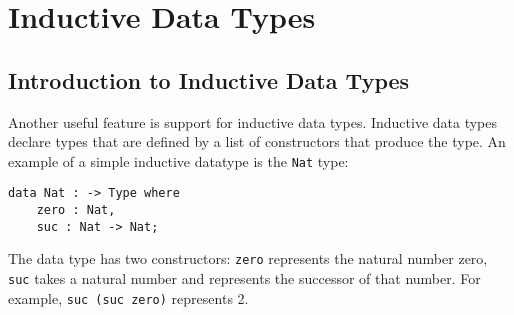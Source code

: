 \chapter{Inductive Data Types}
\label{ch:datatypes}

\section{Introduction to Inductive Data Types}
\label{ch:datatypes:intro}

Another useful feature is support for inductive data types. Inductive data types declare types that are defined by a list of constructors that produce the type. An example of a simple inductive datatype is the \verb|Nat| type:
\begin{lstlisting}
data Nat : -> Type where
    zero : Nat,
    suc : Nat -> Nat;
\end{lstlisting}
The data type has two constructors: \verb|zero| represents the natural number zero, \verb|suc| takes a natural number and represents the successor of that number. For example, \verb|suc (suc zero)| represents 2.


